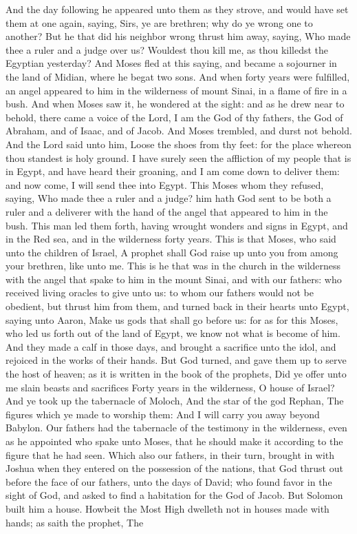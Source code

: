 And the day following he appeared unto them as they strove, and would have set them at one again, saying, Sirs, ye are brethren; why do ye wrong one to another? But he that did his neighbor wrong thrust him away, saying, Who made thee a ruler and a judge over us? Wouldest thou kill me, as thou killedst the Egyptian yesterday? And Moses fled at this saying, and became a sojourner in the land of Midian, where he begat two sons. And when forty years were fulfilled, an angel appeared to him in the wilderness of mount Sinai, in a flame of fire in a bush. And when Moses saw it, he wondered at the sight: and as he drew near to behold, there came a voice of the Lord, I am the God of thy fathers, the God of Abraham, and of Isaac, and of Jacob. And Moses trembled, and durst not behold. And the Lord said unto him, Loose the shoes from thy feet: for the place whereon thou standest is holy ground. I have surely seen the affliction of my people that is in Egypt, and have heard their groaning, and I am come down to deliver them: and now come, I will send thee into Egypt. This Moses whom they refused, saying, Who made thee a ruler and a judge? him hath God sent to be both a ruler and a deliverer with the hand of the angel that appeared to him in the bush. This man led them forth, having wrought wonders and signs in Egypt, and in the Red sea, and in the wilderness forty years. This is that Moses, who said unto the children of Israel, A prophet shall God raise up unto you from among your brethren, like unto me. This is he that was in the church in the wilderness with the angel that spake to him in the mount Sinai, and with our fathers: who received living oracles to give unto us: to whom our fathers would not be obedient, but thrust him from them, and turned back in their hearts unto Egypt, saying unto Aaron, Make us gods that shall go before us: for as for this Moses, who led us forth out of the land of Egypt, we know not what is become of him. And they made a calf in those days, and brought a sacrifice unto the idol, and rejoiced in the works of their hands. But God turned, and gave them up to serve the host of heaven; as it is written in the book of the prophets, Did ye offer unto me slain beasts and sacrifices Forty years in the wilderness, O house of Israel?  And ye took up the tabernacle of Moloch, And the star of the god Rephan, The figures which ye made to worship them: And I will carry you away beyond Babylon.  Our fathers had the tabernacle of the testimony in the wilderness, even as he appointed who spake unto Moses, that he should make it according to the figure that he had seen. Which also our fathers, in their turn, brought in with Joshua when they entered on the possession of the nations, that God thrust out before the face of our fathers, unto the days of David; who found favor in the sight of God, and asked to find a habitation for the God of Jacob. But Solomon built him a house. Howbeit the Most High dwelleth not in houses made with hands; as saith the prophet,  The 